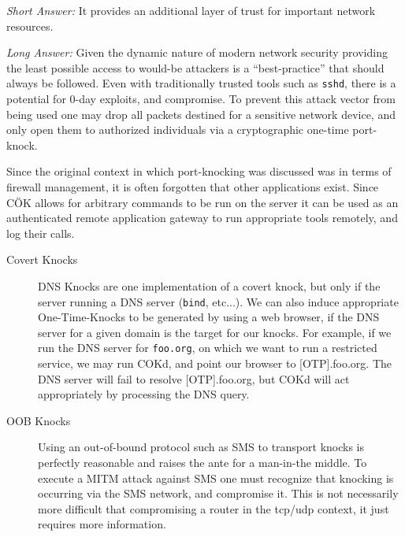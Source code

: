 \documentclass[landscape,twocolumn]{foils}
\begin{document}

\emph{Short Answer:} It provides an additional layer of trust for important network resources.

\emph{Long Answer:} Given the dynamic nature of modern network security providing the least possible access to would-be attackers is a ``best-practice'' that should always be followed.  Even with traditionally trusted tools such as \texttt{sshd}, there is a potential for 0-day exploits, and compromise.  To prevent this  attack vector from being used one may drop all packets destined for a sensitive network device, and only open them to authorized individuals via  a cryptographic one-time port-knock.

Since the original context in which port-knocking was discussed was in terms of firewall management, it is often forgotten that other applications exist.  Since C\"{O}K allows for arbitrary commands to be run on the server it can be used as an authenticated remote application gateway to run appropriate tools remotely, and log their calls.

\large
{}

\raggedright
\footnotesize

\begin{description}
\item[Covert Knocks]  DNS Knocks are one implementation of a covert knock, but only  if the server running a DNS server (\texttt{bind}, etc...).  We can also induce appropriate One-Time-Knocks to be generated by using a web browser, if the DNS server for a given domain is the target for our knocks.  For example, if we run the DNS server for \texttt{foo.org}, on which we want to run a restricted service, we may run COKd, and point our browser to [OTP].foo.org.  The DNS server will fail to resolve [OTP].foo.org, but COKd will act appropriately by processing the DNS query.

\item[OOB Knocks] Using an out-of-bound protocol such as SMS to transport knocks is perfectly reasonable and raises the ante for a man-in-the middle.  To execute a MITM attack against SMS one must recognize that knocking is occurring via the SMS network, and compromise it.  This is not necessarily more difficult that compromising a router in the tcp/udp context, it just requires more information.

\end{description}
\end{document}
